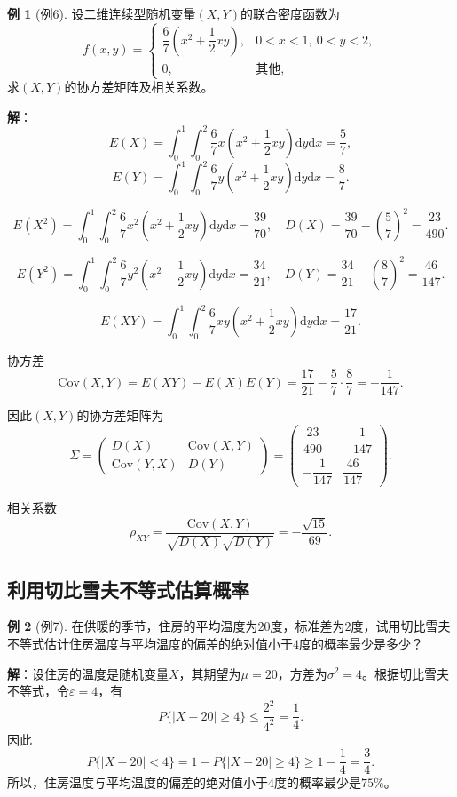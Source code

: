 \documentclass[11pt,a4paper]{report}
\theoremstyle{definition}
\newtheorem{example}{例}[chapter]
\theoremstyle{plain}
\begin{document}
\begin{example}[例6]
设二维连续型随机变量$(X,Y)$的联合密度函数为
\[
f(x,y)=\begin{cases}
\dfrac{6}{7}\left(x^2+\dfrac{1}{2}xy\right), & 0<x<1,\ 0<y<2,\\[8pt]
0, & \text{其他},
\end{cases}
\]
求$(X,Y)$的协方差矩阵及相关系数。

\textbf{解}：
\[
E(X)=\int_{0}^{1}\int_{0}^{2}\frac{6}{7}x\left(x^2+\frac{1}{2}xy\right)\mathrm{d}y\mathrm{d}x=\frac{5}{7},
\]
\[
E(Y)=\int_{0}^{1}\int_{0}^{2}\frac{6}{7}y\left(x^2+\frac{1}{2}xy\right)\mathrm{d}y\mathrm{d}x=\frac{8}{7}.
\]

\[
E(X^2)=\int_{0}^{1}\int_{0}^{2}\frac{6}{7}x^2\left(x^2+\frac{1}{2}xy\right)\mathrm{d}y\mathrm{d}x=\frac{39}{70},
\quad
D(X)=\frac{39}{70}-\left(\frac{5}{7}\right)^2=\frac{23}{490}.
\]

\[
E(Y^2)=\int_{0}^{1}\int_{0}^{2}\frac{6}{7}y^2\left(x^2+\frac{1}{2}xy\right)\mathrm{d}y\mathrm{d}x=\frac{34}{21},
\quad
D(Y)=\frac{34}{21}-\left(\frac{8}{7}\right)^2=\frac{46}{147}.
\]

\[
E(XY)=\int_{0}^{1}\int_{0}^{2}\frac{6}{7}xy\left(x^2+\frac{1}{2}xy\right)\mathrm{d}y\mathrm{d}x=\frac{17}{21}.
\]

协方差
\[
\mathrm{Cov}(X,Y)=E(XY)-E(X)E(Y)=\frac{17}{21}-\frac{5}{7}\cdot\frac{8}{7}=-\frac{1}{147}.
\]

因此$(X,Y)$的协方差矩阵为
\[
\Sigma=\begin{pmatrix}
D(X) & \mathrm{Cov}(X,Y)\\[4pt]
\mathrm{Cov}(Y,X) & D(Y)
\end{pmatrix}
=\begin{pmatrix}
\dfrac{23}{490} & -\dfrac{1}{147}\\[8pt]
-\dfrac{1}{147} & \dfrac{46}{147}
\end{pmatrix}.
\]

相关系数
\[
\rho_{XY}=\frac{\mathrm{Cov}(X,Y)}{\sqrt{D(X)}\sqrt{D(Y)}}=-\frac{\sqrt{15}}{69}.
\]
\end{example}

\subsection{利用切比雪夫不等式估算概率}

\begin{example}[例7]
在供暖的季节，住房的平均温度为$20$度，标准差为$2$度，试用切比雪夫不等式估计住房温度与平均温度的偏差的绝对值小于$4$度的概率最少是多少？

\textbf{解}：设住房的温度是随机变量$X$，其期望为$\mu=20$，方差为$\sigma^2=4$。根据切比雪夫不等式，令$\varepsilon=4$，有
\[
P\{|X-20|\geq 4\}\leq\frac{2^2}{4^2}=\frac{1}{4}.
\]
因此
\[
P\{|X-20|<4\}=1-P\{|X-20|\geq 4\}\geq 1-\frac{1}{4}=\frac{3}{4}.
\]
所以，住房温度与平均温度的偏差的绝对值小于$4$度的概率最少是$75\%$。
\end{example}
\end{document}
